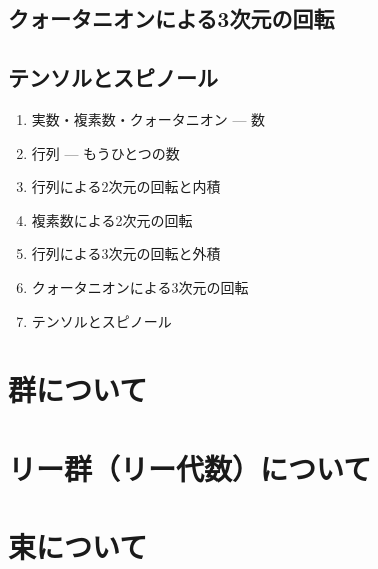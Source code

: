 \documentclass{jsbook}
\begin{document}
\section{クォータニオンによる3次元の回転}
\section{テンソルとスピノール}

\begin{enumerate}
\item 実数・複素数・クォータニオン --- 数
\item 行列 --- もうひとつの数
\item 行列による2次元の回転と内積
\item 複素数による2次元の回転
\item 行列による3次元の回転と外積
\item クォータニオンによる3次元の回転
\item テンソルとスピノール
\end{enumerate}


\chapter{群について}

\chapter{リー群（リー代数）について}

\chapter{束について}
\end{document}
